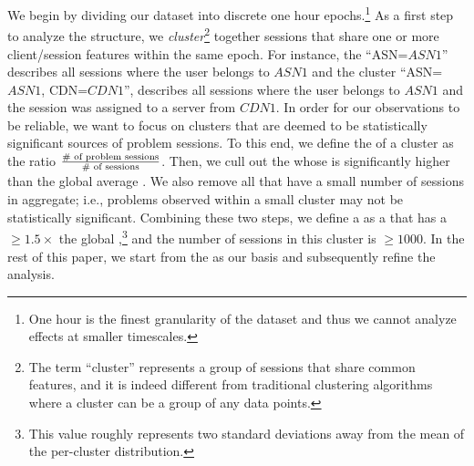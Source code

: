  We begin by dividing our dataset into discrete one 
 hour epochs.\footnote{One hour is the finest 
 granularity of the dataset and thus we cannot 
 analyze effects at smaller timescales.} As a
first step to analyze the structure, we 
\emph{cluster}\footnote{The term ``cluster'' represents a 
group of sessions that share common features, and it is 
indeed  different from traditional   clustering algorithms 
where a cluster can be a group of any data points.} 
together sessions that share one or more client/session 
features within the same epoch.   
For instance, the \cluster ``ASN=$\mathit{ASN1}$'' describes 
all sessions where the user belongs
to $\mathit{ASN1}$ and the cluster 
``ASN=$\mathit{ASN1}$, CDN=$\mathit{CDN1}$'', 
describes all sessions where the
user belongs to $\mathit{ASN1}$ and the session was 
assigned to a server from $\mathit{CDN1}$.
In order for our observations to be reliable, 
we want to focus on  clusters that are deemed to be 
statistically significant sources of problem sessions. 
To this end, we define the \problemratio of a
cluster as the ratio 
$\frac{\textrm{\# of problem sessions}}{\textrm{\# of
sessions}}$. Then, we cull out the \clusters whose 
\problemratio is
significantly higher than the global average \problemratio.  
We also remove all \clusters that have a small number 
of sessions in aggregate; i.e., problems observed within a 
small cluster may not be statistically significant.
Combining these two steps, we define a \problemcluster 
as a \cluster that has a \problemratio $\geq 1.5 \times$ the
global \problemratio,\footnote{This value roughly represents 
two standard deviations away  from the mean of the
per-cluster \problemratio distribution.}  and the number of 
sessions in this cluster is $\geq1000$.  
In the rest of this paper, we start from the \problemclusters 
as our basis and subsequently refine the analysis.
 

